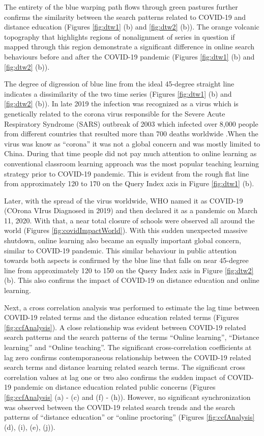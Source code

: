 \documentclass[11pt,a4paper,]{article}
\begin{document}
The entirety of the blue warping path flows through green pastures further confirms the similarity between the search patterns related to COVID-19 and distance education (Figures \ref{fig:dtw1} (b) and \ref{fig:dtw2} (b)). The orange volcanic topography that highlights regions of nonalignment of series in question if mapped through this region demonstrate a significant difference in online search behaviours before and after the COVID-19 pandemic (Figures \ref{fig:dtw1} (b) and \ref{fig:dtw2} (b)).

The degree of digression of blue line from the ideal 45-degree straight line indicates a dissimilarity of the two time
series (Figures \ref{fig:dtw1} (b) and \ref{fig:dtw2} (b)). In late 2019 the infection was recognized as a virus which is genetically related to the corona virus responsible for the Severe Acute Respiratory Syndrome (SARS) outbreak of 2003 which infected over 8,000 people from different countries that resulted more than 700 deaths worldwide \autocite{ciotti2019covid}.When the virus was know as ``corona'' it was not a global concern and was mostly limited to China. During that time people did not pay much attention to online learning as conventional classroom learning approach was the most popular teaching learning strategy prior to COVID-19 pandemic. This is evident from the rough flat line from approximately 120 to 170 on the Query Index axis in Figure \ref{fig:dtw1} (b).

Later, with the spread of the virus worldwide, WHO named it as COVID-19 (COrona VIrus Diagnosed in 2019) and then declared it as a pandemic on March 11, 2020. With that, a near total closure of schools were observed all around the world (Figures \ref{fig:covidImpactWorld}). With this sudden unexpected massive shutdown, online learning also became an equally important global concern, similar to COVID-19 pandemic. This similar behaviour in public attention towards both aspects is confirmed by the blue line that falls on near 45-degree line from approximately 120 to 150 on the Query Index axis in Figure \ref{fig:dtw2} (b). This also confirms the impact of COVID-19 on distance education and online learning.

Next, a cross correlation analysis was performed to estimate the lag time between COVID-19 related terms and the distance education related terms (Figures \ref{fig:ccfAnalysis}). A close relationship was evident between COVID-19 related search patterns and the search patterns of the terms ``Online learning'', ``Distance learning'' and ``Online teaching''. The significant cross-correlation coefficients at lag zero confirms contemporaneous relationship between the COVID-19 related search terms and distance learning related search terms. The significant cross correlation values at lag one or two also confirms the sudden impact of COVID-19 pandemic on distance education related public concerns (Figures \ref{fig:ccfAnalysis} (a) - (c) and (f) - (h)). However, no significant synchronization was observed between the COVID-19 related search trends and the search patterns of ``distance education'' or ``online proctoring'' (Figures \ref{fig:ccfAnalysis} (d), (i), (e), (j)).
\end{document}
